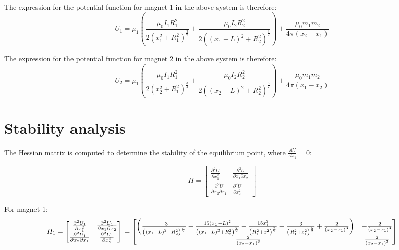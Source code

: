 \documentclass[english]{article}
\begin{document}
The expression for the potential function for magnet 1 in the above system is therefore:
$$U_1 = \mu_1\left(\frac{\mu_0 I_1 R_{1}^{2}}{2 \left(x_1^2 + R_1^2 \right)^{\frac{3}{2}}} + \frac{\mu_0 I_2 R_{2}^{2}}{2 \left(\left(x_1 - L \right)^2 + R_2^2 \right)^{\frac{3}{2}}} \right) + \frac{\mu_0 m_1 m_2}{4\pi \left(x_2 - x_1\right)}$$


The expression for the potential function for magnet 2 in the above system is therefore:
$$U_2 = \mu_1\left(\frac{\mu_0 I_1 R_{1}^{2}}{2 \left(x_2^2 + R_1^2 \right)^{\frac{3}{2}}} + \frac{\mu_0 I_2 R_{2}^{2}}{2 \left(\left(x_2 - L \right)^2 + R_2^2 \right)^{\frac{3}{2}}} \right) + \frac{\mu_0 m_1 m_2}{4\pi \left(x_1 - x_2\right)}$$


\section*{Stability analysis}
The Hessian matrix is computed to determine the stability of the equilibrium point, where $\frac{dU}{dx_1}=0$:

$$H = \begin{bmatrix}
	\frac{\partial ^2 U}{\partial x_1^2} & \frac{\partial ^2 U}{\partial x_1 \partial x_2}\\
	\frac{\partial ^2 U}{\partial x_2 \partial x_1} & \frac{\partial ^2 U}{\partial x_2^2}
\end{bmatrix}
$$

For magnet 1:
$$H_1 = \begin{bmatrix}
	\frac{\partial ^2 U_1}{\partial x_1^2} & \frac{\partial ^2 U_1}{\partial x_1 \partial x_2}\\
	\frac{\partial ^2 U_1}{\partial x_2 \partial x_1} & \frac{\partial ^2 U_1}{\partial x_2^2}
\end{bmatrix}
\\=
\begin{bmatrix}
	\left(\frac{-3}{\left(\left(x_1 - L\right)^2 + R_2^2\right)^{\frac{5}{2}}} + \frac{15\left(x_1-L\right)^2}{\left(\left(x_1 - L\right)^2 + R_2^2\right)^{\frac{7}{2}}} + \frac{15x_1^2}{\left(R_1^2 + x_1^2 \right)^{\frac{7}{2}}} - \frac{3}{\left(R_1^2 + x_1^2 \right)^{\frac{5}{2}}} + \frac{2}{\left(x_2-x_1\right)^3}\right)
	& 
	-\frac{2}{\left(x_2-x_1\right)^3}\\
	-\frac{2}{\left(x_2-x_1\right)^3}
	&
	\frac{2}{\left(x_2-x_1\right)^3}
\end{bmatrix}
$$
\end{document}
